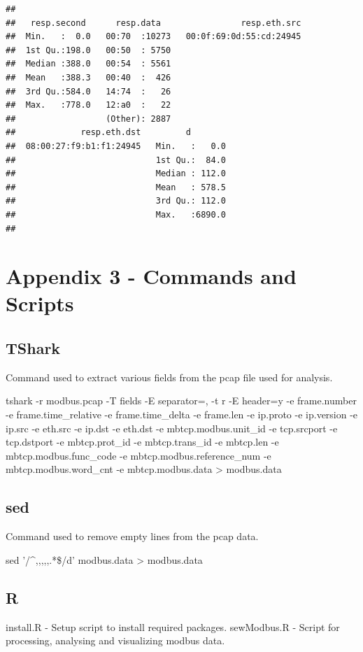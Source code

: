 \documentclass[]{article}
\begin{document}
\begin{verbatim}
##                                                                        
##   resp.second      resp.data                resp.eth.src  
##  Min.   :  0.0   00:70  :10273   00:0f:69:0d:55:cd:24945  
##  1st Qu.:198.0   00:50  : 5750                            
##  Median :388.0   00:54  : 5561                            
##  Mean   :388.3   00:40  :  426                            
##  3rd Qu.:584.0   14:74  :   26                            
##  Max.   :778.0   12:a0  :   22                            
##                  (Other): 2887                            
##             resp.eth.dst         d         
##  08:00:27:f9:b1:f1:24945   Min.   :   0.0  
##                            1st Qu.:  84.0  
##                            Median : 112.0  
##                            Mean   : 578.5  
##                            3rd Qu.: 112.0  
##                            Max.   :6890.0  
## 
\end{verbatim}

\section{Appendix 3 - Commands and
Scripts}\label{appendix-3---commands-and-scripts}

\subsection{TShark}\label{tshark}

Command used to extract various fields from the pcap file used for
analysis.

tshark -r modbus.pcap -T fields -E separator=, -t r -E header=y -e
frame.number -e frame.time\_relative -e frame.time\_delta -e frame.len
-e ip.proto -e ip.version -e ip.src -e eth.src -e ip.dst -e eth.dst -e
mbtcp.modbus.unit\_id -e tcp.srcport -e tcp.dstport -e mbtcp.prot\_id -e
mbtcp.trans\_id -e mbtcp.len -e mbtcp.modbus.func\_code -e
mbtcp.modbus.reference\_num -e mbtcp.modbus.word\_cnt -e
mbtcp.modbus.data \textgreater{} modbus.data

\subsection{sed}\label{sed}

Command used to remove empty lines from the pcap data.

sed '/\^{},,,,,.*\$/d' modbus.data \textgreater{} modbus.data

\subsection{R}\label{r}

install.R - Setup script to install required packages. sewModbus.R -
Script for processing, analysing and visualizing modbus data.
\end{document}
